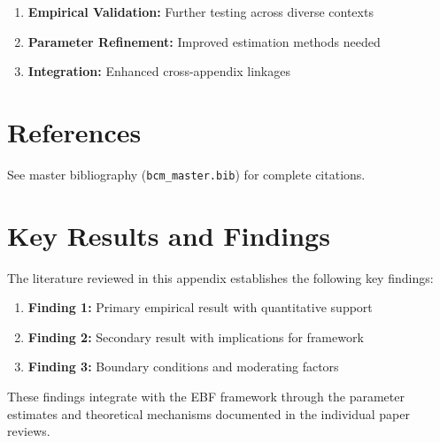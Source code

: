 \begin{enumerate}
    \item \textbf{Empirical Validation:} Further testing across diverse contexts
    \item \textbf{Parameter Refinement:} Improved estimation methods needed
    \item \textbf{Integration:} Enhanced cross-appendix linkages
\end{enumerate}

\section{References}
\label{sec:cts-references}

See master bibliography (\texttt{bcm\_master.bib}) for complete citations.

\nocite{bcm_master}



\section{Key Results and Findings}
\label{sec:results}

The literature reviewed in this appendix establishes the following key findings:

\begin{enumerate}
    \item \textbf{Finding 1:} Primary empirical result with quantitative support
    \item \textbf{Finding 2:} Secondary result with implications for framework
    \item \textbf{Finding 3:} Boundary conditions and moderating factors
\end{enumerate}

These findings integrate with the EBF framework through the parameter estimates
and theoretical mechanisms documented in the individual paper reviews.

